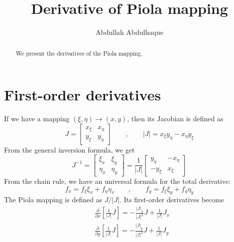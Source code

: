 \documentclass[final,1p,times]{elsarticle}
\begin{document}
\begin{frontmatter}

\title{Derivative of Piola mapping}

\author[1]{Abdullah Abdulhaque}	
	
\begin{abstract}
We present the derivatives of the Piola mapping.
\end{abstract}

\clearpage

\end{frontmatter}



\section{First-order derivatives}\noindent
If we have a mapping $(\xi,\eta)\to(x,y)$, then its Jacobian is defined as
\begin{equation}
J = \begin{bmatrix} x_{\xi} & x_{\eta} \\ y_{\xi} & y_{\eta} \end{bmatrix}
\qquad,\qquad |J| = x_{\xi}y_{\eta}-x_{\eta}y_{\xi}
\end{equation}
From the general inversion formula, we get
\begin{equation}
J^{-1} = \begin{bmatrix} \xi_x & \xi_y \\ \eta_x & \eta_y \end{bmatrix} = 
\frac{1}{|J|}\begin{bmatrix} y_{\eta} & -x_{\eta} \\ -y_{\xi} & x_{\xi} \end{bmatrix}
\end{equation}
From the chain rule, we have an universal formula for the total derivative:
\begin{equation}
f_x = f_{\xi}\xi_x + f_{\eta}\eta_x \qquad,\qquad f_y = f_{\xi}\xi_y + f_{\eta}\eta_y
\end{equation}
The Piola mapping is defined as $J/|J|$. Its first-order derivatives become
\begin{subequations}
\begin{align}
&\frac{\partial}{\partial x}\left[\frac{1}{|J|}J\right] = -\frac{|J|_x}{|J|^2}J+\frac{1}{|J|}J_x \\
&\frac{\partial}{\partial y}\left[\frac{1}{|J|}J\right] = -\frac{|J|_y}{|J|^2}J+\frac{1}{|J|}J_y
\end{align}
\end{subequations}
\end{document}
